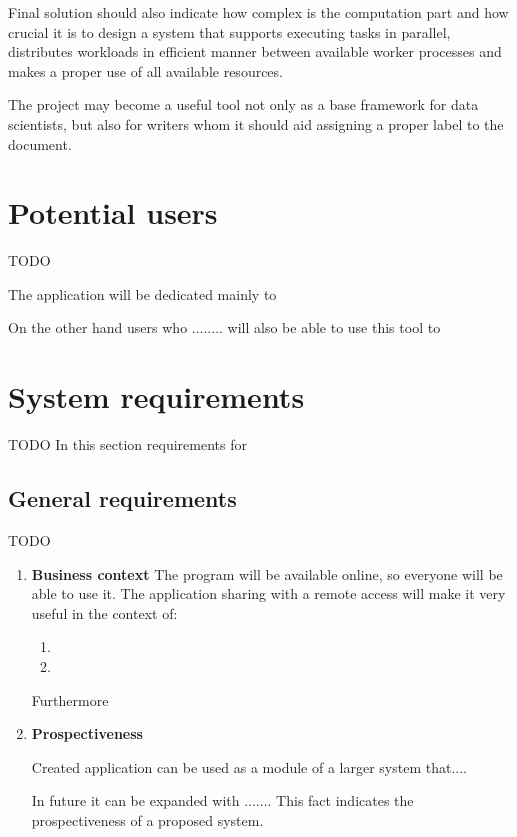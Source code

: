 Final solution should also indicate how complex is the computation part and how crucial it is to design a system that supports executing tasks in parallel, distributes workloads in efficient manner between available worker processes and makes a proper use of all available resources.

The project may become a useful tool not only as a base framework for data scientists, but also for writers whom it should aid assigning a proper label to the document.

\section{Potential users}
TODO
\label{users}

The application will be dedicated mainly to 

On the other hand users who ........ will also be able to use this tool to 


\section{System requirements}
TODO
In this section requirements for

\subsection{General requirements}
TODO

\begin{enumerate}

\item \textbf{Business context} The program will be available online, so everyone will be able to use it. The application sharing with a remote access will make it very useful in the context of:

\begin{enumerate}

\item 

\item 

\end{enumerate}

Furthermore 

\item \textbf{Prospectiveness}

Created application can be used as a module of a larger system that.... 

In future it can be expanded with ....... This fact indicates the prospectiveness of a proposed system. 

\end{enumerate}

